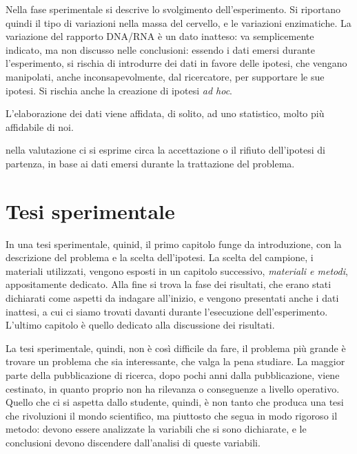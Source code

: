 Nella fase sperimentale si descrive lo svolgimento dell'esperimento. Si riportano quindi il tipo di variazioni nella massa del 
cervello, e le variazioni enzimatiche. La variazione del rapporto DNA/RNA è un dato inatteso: va semplicemente indicato, ma non 
discusso nelle conclusioni: essendo i dati emersi durante l'esperimento, si rischia di introdurre dei dati in favore delle ipotesi, 
che vengano manipolati, anche inconsapevolmente, dal ricercatore, per supportare le sue ipotesi. Si rischia anche la creazione di 
ipotesi \textit{ad hoc}.

L'elaborazione dei dati viene affidata, di solito, ad uno statistico, molto più affidabile di noi.

nella valutazione ci si esprime circa la accettazione o il rifiuto dell'ipotesi di partenza, in base ai dati emersi durante la 
trattazione del problema.

\section{Tesi sperimentale}
In una tesi sperimentale, quinid, il primo capitolo funge da introduzione, con la descrizione del problema e la scelta dell'ipotesi. 
La scelta del campione, i materiali utilizzati, vengono esposti in un capitolo successivo, \textit{materiali e metodi}, appositamente 
dedicato. Alla fine si trova la fase dei risultati, che erano stati dichiarati come aspetti da indagare all'inizio, e vengono 
presentati anche i dati inattesi, a cui ci siamo trovati davanti durante l'esecuzione dell'esperimento.
L'ultimo capitolo è quello dedicato alla discussione dei risultati.

La tesi sperimentale, quindi, non è così difficile da fare, il problema più grande è trovare un problema che sia interessante, che 
valga la pena studiare. La maggior parte della pubblicazione di ricerca, dopo pochi anni dalla pubblicazione, viene cestinato, in 
quanto proprio non ha rilevanza o conseguenze a livello operativo. Quello che ci si aspetta dallo studente, quindi, è non tanto che 
produca una tesi che rivoluzioni il mondo scientifico, ma piuttosto che segua in modo rigoroso il metodo: devono essere analizzate la 
variabili che si sono dichiarate, e le conclusioni devono discendere dall'analisi di queste variabili.

